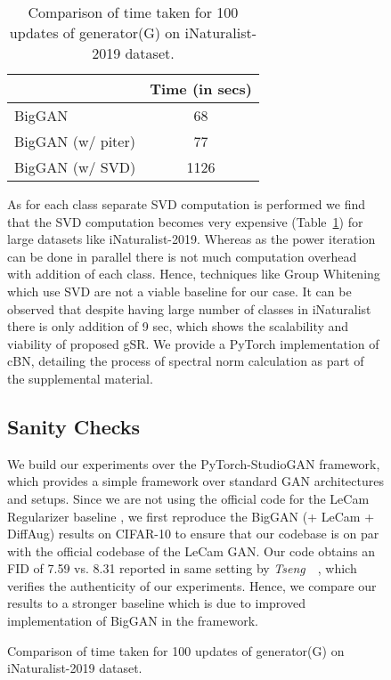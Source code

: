\documentclass[runningheads,table]{llncs}
\begin{document}
\begin{figure*}[!ht]
\begin{subfigure}[b]{\textwidth}
\begin{table}[h]
\centering
\begin{tabular}{l|c}
\toprule
                  & Time (in secs) \\ \midrule
BigGAN            & 68             \\ 
BigGAN (w/ piter) & 77             \\ 
BigGAN (w/ SVD)   & 1126         \\ \bottomrule
\end{tabular}
\caption{Comparison of time taken for 100 updates of generator(G) on iNaturalist-2019 dataset. }
\label{tab:supp:time_comp}
\end{table}

 As for each class separate SVD computation is performed we find that the SVD computation becomes very expensive (Table~\ref{tab:supp:time_comp}) for large datasets like iNaturalist-2019. Whereas as the power iteration can be done in parallel there is not much computation overhead with addition of each class. Hence, techniques like Group Whitening \cite{huang2021group} which use SVD are not a viable baseline for our case. It can be observed that despite having large number of classes in iNaturalist there is only addition of 9 sec, which shows the scalability and viability of proposed gSR. We provide a PyTorch implementation of cBN, detailing the process of spectral norm calculation as part of the supplemental material.

\subsection{Sanity Checks}
\label{subsec:supp:sanity}

We build our experiments over the PyTorch-StudioGAN framework, which provides a simple framework over standard GAN architectures and setups. Since we are not using the official code for the LeCam Regularizer baseline \cite{tseng2021regularizing}, we first reproduce the BigGAN (+ LeCam + DiffAug) results on CIFAR-10 to ensure that our codebase is on par with the official codebase of the LeCam GAN. Our code obtains an FID of 7.59 vs. 8.31 reported in same setting by \textit{Tseng}~\etal~\cite{tseng2021regularizing}, which verifies the authenticity of our experiments. Hence, we compare our results to a stronger baseline which is due to improved implementation of BigGAN in the framework.


\end{subfigure}
\end{figure*}
\end{document}
